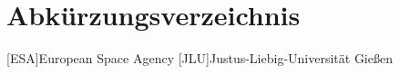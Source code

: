 \documentclass[fontsize=11pt,%
twoside,%
BCOR          = 8mm, %
DIV           = 11,  %
titlepage     = off,%
index=totoc,%
xcolor        = pdftex,%
dvipsnames,%
listof        = notnumbered]{scrreprt}
\begin{document}


\cleardoublepage

\pagestyle{scrheadings}

\setcounter{page}{5} %

\tableofcontents
\cleardoublepage

\listoffigures
\cleardoublepage

\listoftables
\cleardoublepage

\chapter*{Abk\"{u}rzungsverzeichnis}
\begin{acronym}
[ESA]{\dotfill European Space Agency}
[JLU]{\dotfill Justus-Liebig-Universit\"{a}t Gie{\ss}en}
\end{acronym}
\cleardoublepage











\printbibliography[title={Bibliography}, heading=bibintoc]

\cleardoublepage

\appendix

\end{document}
